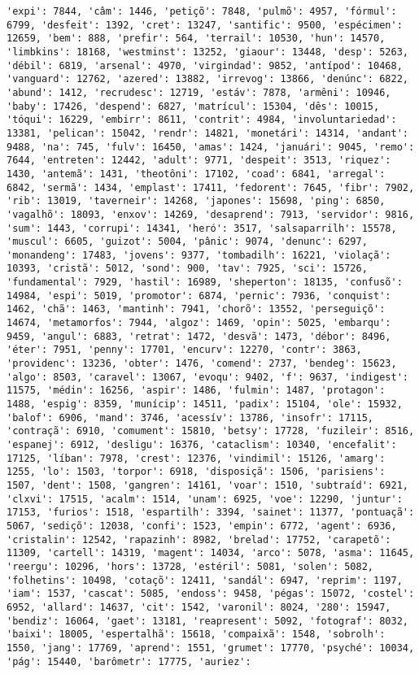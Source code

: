 \begin{Verbatim}[commandchars=\\\{\}]
'expi': 7844, 'câm': 1446, 'petiçõ': 7848, 'pulmõ': 4957, 'fórmul': 6799, 'desfeit': 1392, 'cret': 13247, 'santific': 9500, 'espécimen': 12659, 'bem': 888, 'prefir': 564, 'terrail': 10530, 'hun': 14570, 'limbkins': 18168, 'westminst': 13252, 'giaour': 13448, 'desp': 5263, 'débil': 6819, 'arsenal': 4970, 'virgindad': 9852, 'antípod': 10468, 'vanguard': 12762, 'azered': 13882, 'irrevog': 13866, 'denúnc': 6822, 'abund': 1412, 'recrudesc': 12719, 'estáv': 7878, 'armêni': 10946, 'baby': 17426, 'despend': 6827, 'matrícul': 15304, 'dês': 10015, 'tóqui': 16229, 'embirr': 8611, 'contrit': 4984, 'involuntariedad': 13381, 'pelican': 15042, 'rendr': 14821, 'monetári': 14314, 'andant': 9488, 'na': 745, 'fulv': 16450, 'amas': 1424, 'januári': 9045, 'remo': 7644, 'entreten': 12442, 'adult': 9771, 'despeit': 3513, 'riquez': 1430, 'antemã': 1431, 'theotôni': 17102, 'coad': 6841, 'arregal': 6842, 'sermã': 1434, 'emplast': 17411, 'fedorent': 7645, 'fibr': 7902, 'rib': 13019, 'taverneir': 14268, 'japones': 15698, 'ping': 6850, 'vagalhõ': 18093, 'enxov': 14269, 'desaprend': 7913, 'servidor': 9816, 'sum': 1443, 'corrupi': 14341, 'heró': 3517, 'salsaparrilh': 15578, 'muscul': 6605, 'guizot': 5004, 'pânic': 9074, 'denunc': 6297, 'monandeng': 17483, 'jovens': 9377, 'tombadilh': 16221, 'violaçã': 10393, 'cristã': 5012, 'sond': 900, 'tav': 7925, 'sci': 15726, 'fundamental': 7929, 'hastil': 16989, 'sheperton': 18135, 'confusõ': 14984, 'espi': 5019, 'promotor': 6874, 'pernic': 7936, 'conquist': 1462, 'chã': 1463, 'mantinh': 7941, 'chorõ': 13552, 'perseguiçõ': 14674, 'metamorfos': 7944, 'algoz': 1469, 'opin': 5025, 'embarqu': 9459, 'angul': 6883, 'retrat': 1472, 'desvã': 1473, 'débor': 8496, 'éter': 7951, 'penny': 17701, 'encurv': 12270, 'contr': 3863, 'providenc': 13236, 'obter': 1476, 'comend': 2737, 'bendeg': 15623, 'algo': 8503, 'caravel': 13067, 'evoqu': 9402, 'f': 9637, 'indigest': 11575, 'médin': 16256, 'aspir': 1486, 'fulmin': 1487, 'protagon': 1488, 'espig': 8359, 'munícip': 14511, 'padix': 15104, 'ole': 15932, 'balof': 6906, 'mand': 3746, 'acessív': 13786, 'insofr': 17115, 'contraçã': 6910, 'comument': 15810, 'betsy': 17728, 'fuzileir': 8516, 'espanej': 6912, 'desligu': 16376, 'cataclism': 10340, 'encefalit': 17125, 'líban': 7978, 'crest': 12376, 'vindimil': 15126, 'amarg': 1255, 'lo': 1503, 'torpor': 6918, 'disposiçã': 1506, 'parisiens': 1507, 'dent': 1508, 'gangren': 14161, 'voar': 1510, 'subtraíd': 6921, 'clxvi': 17515, 'acalm': 1514, 'unam': 6925, 'voe': 12290, 'juntur': 17153, 'furios': 1518, 'espartilh': 3394, 'sainet': 11377, 'pontuaçã': 5067, 'sediçõ': 12038, 'confi': 1523, 'empin': 6772, 'agent': 6936, 'cristalin': 12542, 'rapazinh': 8982, 'brelad': 17752, 'carapetõ': 11309, 'cartell': 14319, 'magent': 14034, 'arco': 5078, 'asma': 11645, 'reergu': 10296, 'hors': 13728, 'estéril': 5081, 'solen': 5082, 'folhetins': 10498, 'cotaçõ': 12411, 'sandál': 6947, 'reprim': 1197, 'iam': 1537, 'cascat': 5085, 'endoss': 9458, 'pégas': 15072, 'costel': 6952, 'allard': 14637, 'cit': 1542, 'varonil': 8024, '280': 15947, 'bendiz': 16064, 'gaet': 13181, 'reapresent': 5092, 'fotograf': 8032, 'baixi': 18005, 'espertalhã': 15618, 'compaixã': 1548, 'sobrolh': 1550, 'jang': 17769, 'aprend': 1551, 'grumet': 17770, 'psyché': 10034, 'pág': 15440, 'barômetr': 17775, 'auriez': 
\end{Verbatim}
